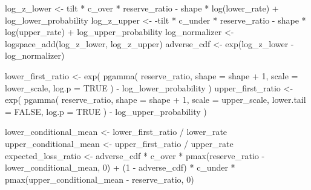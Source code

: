 \documentclass[
  10pt,
]{article}
\newenvironment{Shaded}{\begin{snugshade}}{\end{snugshade}}
\newcommand{\AttributeTok}[1]{\textcolor[rgb]{0.77,0.63,0.00}{#1}}
\newcommand{\ConstantTok}[1]{\textcolor[rgb]{0.00,0.00,0.00}{#1}}
\newcommand{\DecValTok}[1]{\textcolor[rgb]{0.00,0.00,0.81}{#1}}
\newcommand{\FunctionTok}[1]{\textcolor[rgb]{0.00,0.00,0.00}{#1}}
\newcommand{\NormalTok}[1]{#1}
\newcommand{\OtherTok}[1]{\textcolor[rgb]{0.56,0.35,0.01}{#1}}
\newcommand{\SpecialCharTok}[1]{\textcolor[rgb]{0.00,0.00,0.00}{#1}}
\begin{document}
\begin{Shaded}
\begin{Highlighting}[]
\NormalTok{  log\_z\_lower }\OtherTok{\textless{}{-}}
\NormalTok{    tilt }\SpecialCharTok{*}\NormalTok{ c\_over }\SpecialCharTok{*}\NormalTok{ reserve\_ratio }\SpecialCharTok{{-}}
\NormalTok{    shape }\SpecialCharTok{*} \FunctionTok{log}\NormalTok{(lower\_rate) }\SpecialCharTok{+}
\NormalTok{    log\_lower\_probability}
\NormalTok{  log\_z\_upper }\OtherTok{\textless{}{-}}
    \SpecialCharTok{{-}}\NormalTok{tilt }\SpecialCharTok{*}\NormalTok{ c\_under }\SpecialCharTok{*}\NormalTok{ reserve\_ratio }\SpecialCharTok{{-}}
\NormalTok{    shape }\SpecialCharTok{*} \FunctionTok{log}\NormalTok{(upper\_rate) }\SpecialCharTok{+}
\NormalTok{    log\_upper\_probability}
\NormalTok{  log\_normalizer }\OtherTok{\textless{}{-}} \FunctionTok{logspace\_add}\NormalTok{(log\_z\_lower, log\_z\_upper)}
\NormalTok{  adverse\_cdf }\OtherTok{\textless{}{-}} \FunctionTok{exp}\NormalTok{(log\_z\_lower }\SpecialCharTok{{-}}\NormalTok{ log\_normalizer)}

\NormalTok{  lower\_first\_ratio }\OtherTok{\textless{}{-}} \FunctionTok{exp}\NormalTok{(}
    \FunctionTok{pgamma}\NormalTok{(}
\NormalTok{      reserve\_ratio,}
      \AttributeTok{shape =}\NormalTok{ shape }\SpecialCharTok{+} \DecValTok{1}\NormalTok{,}
      \AttributeTok{scale =}\NormalTok{ lower\_scale,}
      \AttributeTok{log.p =} \ConstantTok{TRUE}
\NormalTok{    ) }\SpecialCharTok{{-}}\NormalTok{ log\_lower\_probability}
\NormalTok{  )}
\NormalTok{  upper\_first\_ratio }\OtherTok{\textless{}{-}} \FunctionTok{exp}\NormalTok{(}
    \FunctionTok{pgamma}\NormalTok{(}
\NormalTok{      reserve\_ratio,}
      \AttributeTok{shape =}\NormalTok{ shape }\SpecialCharTok{+} \DecValTok{1}\NormalTok{,}
      \AttributeTok{scale =}\NormalTok{ upper\_scale,}
      \AttributeTok{lower.tail =} \ConstantTok{FALSE}\NormalTok{,}
      \AttributeTok{log.p =} \ConstantTok{TRUE}
\NormalTok{    ) }\SpecialCharTok{{-}}\NormalTok{ log\_upper\_probability}
\NormalTok{  )}

\NormalTok{  lower\_conditional\_mean }\OtherTok{\textless{}{-}}\NormalTok{ lower\_first\_ratio }\SpecialCharTok{/}\NormalTok{ lower\_rate}
\NormalTok{  upper\_conditional\_mean }\OtherTok{\textless{}{-}}\NormalTok{ upper\_first\_ratio }\SpecialCharTok{/}\NormalTok{ upper\_rate}
\NormalTok{  expected\_loss\_ratio }\OtherTok{\textless{}{-}}
\NormalTok{    adverse\_cdf }\SpecialCharTok{*}\NormalTok{ c\_over }\SpecialCharTok{*}
      \FunctionTok{pmax}\NormalTok{(reserve\_ratio }\SpecialCharTok{{-}}\NormalTok{ lower\_conditional\_mean, }\DecValTok{0}\NormalTok{) }\SpecialCharTok{+}
\NormalTok{    (}\DecValTok{1} \SpecialCharTok{{-}}\NormalTok{ adverse\_cdf) }\SpecialCharTok{*}\NormalTok{ c\_under }\SpecialCharTok{*}
      \FunctionTok{pmax}\NormalTok{(upper\_conditional\_mean }\SpecialCharTok{{-}}\NormalTok{ reserve\_ratio, }\DecValTok{0}\NormalTok{)}


\end{Highlighting}
\end{Shaded}
\end{document}
